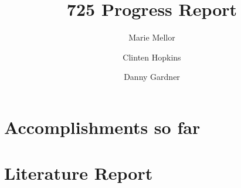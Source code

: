 \documentclass[sigconf]{acmart}
\begin{document}
\title{725 Progress Report}
\author{Marie Mellor \and Clinten Hopkins \and Danny Gardner}

\maketitle

\section{Accomplishments so far}

\section{Literature Report}
\end{document}

